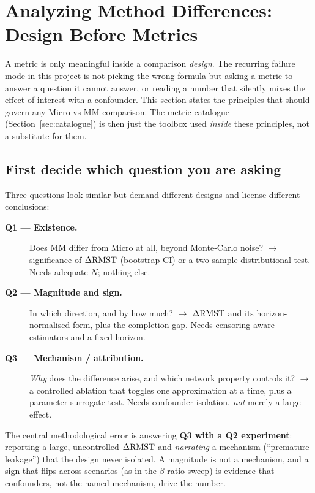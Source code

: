 \documentclass[11pt,a4paper]{article}
\begin{document}
\section{Analyzing Method Differences: Design Before Metrics}
\label{sec:methodology}

A metric is only meaningful inside a comparison \emph{design}.  The recurring
failure mode in this project is not picking the wrong formula but asking a
metric to answer a question it cannot answer, or reading a number that silently
mixes the effect of interest with a confounder.  This section states the
principles that should govern any Micro-vs-MM comparison.  The metric catalogue
(Section~\ref{sec:catalogue}) is then just the toolbox used \emph{inside} these
principles, not a substitute for them.

\subsection{First decide which question you are asking}

Three questions look similar but demand different designs and license different
conclusions:

\begin{description}
  \item[\textbf{Q1 --- Existence.}] Does MM differ from Micro at all, beyond
        Monte-Carlo noise?  $\to$ significance of $\Delta\mathrm{RMST}$ (bootstrap CI) or a
        two-sample distributional test.  Needs adequate $N$; nothing else.
  \item[\textbf{Q2 --- Magnitude and sign.}] In which direction, and by how
        much?  $\to$ $\Delta\mathrm{RMST}$ and its horizon-normalised form, plus the
        completion gap.  Needs censoring-aware estimators and a fixed horizon.
  \item[\textbf{Q3 --- Mechanism / attribution.}] \emph{Why} does the difference
        arise, and which network property controls it?  $\to$ a controlled
        ablation that toggles one approximation at a time, plus a parameter
        surrogate test.  Needs confounder isolation, \emph{not} merely a large
        effect.
\end{description}

The central methodological error is answering \textbf{Q3 with a Q2 experiment}:
reporting a large, uncontrolled $\Delta\mathrm{RMST}$ and \emph{narrating} a mechanism
(``premature leakage'') that the design never isolated.  A magnitude is not a
mechanism, and a sign that flips across scenarios (as in the $\beta$-ratio
sweep) is evidence that confounders, not the named mechanism, drive the number.
\end{document}
